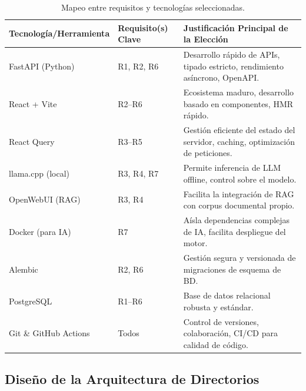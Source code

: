 \begin{table}[H]
  \centering
  \begin{tabularx}{\linewidth}{@{} l l X @{}}
    \toprule
    \textbf{Tecnología/Herramienta} & \textbf{Requisito(s) Clave} & \textbf{Justificación Principal de la Elección} \\
    \midrule
    FastAPI (Python)     & R1, R2, R6    & Desarrollo rápido de APIs, tipado estricto, rendimiento asíncrono, OpenAPI. \\
    React + Vite         & R2–R6         & Ecosistema maduro, desarrollo basado en componentes, HMR rápido. \\
    React Query          & R3–R5         & Gestión eficiente del estado del servidor, caching, optimización de peticiones. \\
    llama.cpp (local)    & R3, R4, R7    & Permite inferencia de LLM offline, control sobre el modelo. \\
    OpenWebUI (RAG)      & R3, R4        & Facilita la integración de RAG con corpus documental propio. \\
    Docker (para IA)     & R7            & Aísla dependencias complejas de IA, facilita despliegue del motor. \\
    Alembic              & R2, R6        & Gestión segura y versionada de migraciones de esquema de BD. \\
    PostgreSQL           & R1–R6         & Base de datos relacional robusta y estándar. \\
    Git \& GitHub Actions& Todos         & Control de versiones, colaboración, CI/CD para calidad de código. \\
    \bottomrule
  \end{tabularx}
  \caption{Mapeo entre requisitos y tecnologías seleccionadas.}
  \label{tab:desarrollo_match-tech-require}
\end{table}

\subsection{Diseño de la Arquitectura de Directorios}
\label{ssec:desarrollo_arch}

